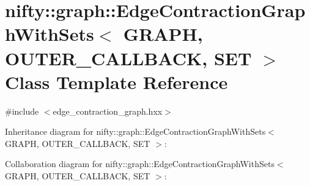 \hypertarget{classnifty_1_1graph_1_1EdgeContractionGraphWithSets}{}\section{nifty\+:\+:graph\+:\+:Edge\+Contraction\+Graph\+With\+Sets$<$ G\+R\+A\+P\+H, O\+U\+T\+E\+R\+\_\+\+C\+A\+L\+L\+B\+A\+C\+K, S\+E\+T $>$ Class Template Reference}
\label{classnifty_1_1graph_1_1EdgeContractionGraphWithSets}


{\ttfamily \#include $<$edge\+\_\+contraction\+\_\+graph.\+hxx$>$}



Inheritance diagram for nifty\+:\+:graph\+:\+:Edge\+Contraction\+Graph\+With\+Sets$<$ G\+R\+A\+P\+H, O\+U\+T\+E\+R\+\_\+\+C\+A\+L\+L\+B\+A\+C\+K, S\+E\+T $>$\+:


Collaboration diagram for nifty\+:\+:graph\+:\+:Edge\+Contraction\+Graph\+With\+Sets$<$ G\+R\+A\+P\+H, O\+U\+T\+E\+R\+\_\+\+C\+A\+L\+L\+B\+A\+C\+K, S\+E\+T $>$\+:
